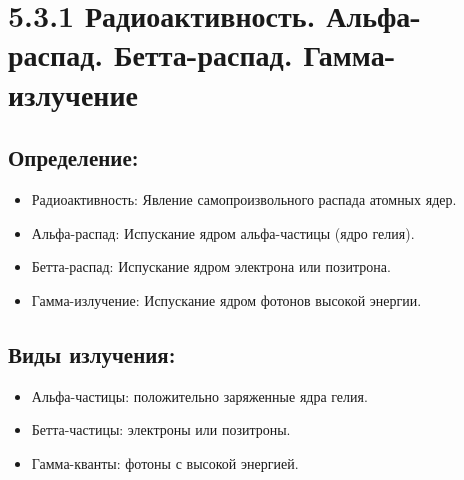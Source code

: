 \documentclass[a4paper,12pt]{article}
\begin{document}
\begin{center}
\end{center}

\vspace{-2em}









\section*{5.3.1 Радиоактивность. Альфа-распад. Бетта-распад. Гамма-излучение}
\vspace{-9pt}
\subsection*{Определение:}
\vspace{-3pt}
\begin{itemize}[itemsep=0pt, topsep=0pt, parsep=3pt]
    \item Радиоактивность: Явление самопроизвольного распада атомных ядер.
    \item Альфа-распад: Испускание ядром альфа-частицы (ядро гелия).
    \item Бетта-распад: Испускание ядром электрона или позитрона.
    \item Гамма-излучение: Испускание ядром фотонов высокой энергии.
\end{itemize}

\vspace{-9pt}
\subsection*{Виды излучения:}
\vspace{-3pt}
\begin{itemize}[itemsep=0pt, topsep=0pt, parsep=3pt]
    \item Альфа-частицы: положительно заряженные ядра гелия.
    \item Бетта-частицы: электроны или позитроны.
    \item Гамма-кванты: фотоны с высокой энергией.
\end{itemize}
\end{document}
